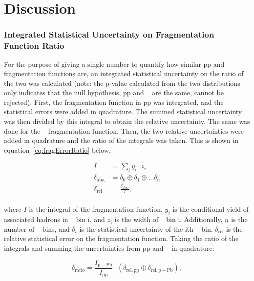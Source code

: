 \chapter{Discussion}

\subsection{Integrated Statistical Uncertainty on Fragmentation Function Ratio}
For the purpose of giving a single number to quantify how similar pp and \pPb~ fragmentation functions are, an integrated statistical uncertainty on the ratio of the two was calculated (note: the p-value calculated from the two distributions only indicates that the null hypothesis, pp and \pPb~ are the same, cannot be rejected). First, the fragmentation function in pp was integrated, and the statistical errors were added in quadrature. The summed statistical uncertainty was then divided by this integral to obtain the relative uncertainty. The same was done for the \pPb~ fragmentation function. Then, the two relative uncertainties were added in quadrature and the ratio of the integrals was taken. This is shown in equation~\ref{eq:fragErrorRatio} below,

\begin{equation}\label{eq:fragErrorRatio}
\begin{split}
    I &= \sum_i y_i\cdot z_i \\
    \delta_\mathrm{abs.} &= \delta_0 \oplus \delta_1 \oplus ...\delta_n\\
    \delta_\mathrm{rel} &= \frac{\delta_\mathrm{abs.}}{I},\\
\end{split}
\end{equation}{}

where $I$ is the integral of the fragmentation function, $y_i$ is the conditional yield of associated hadrons in \zt~ bin i, and $z_i$ is the width of \zt~ bin i. Additionally, $n$ is the number of \zt~ bins, and $\delta_i$ is the statistical uncertainty of the ith \zt~ bin. $\delta_\mathrm{rel}$ is the relative statistical error on the fragmentation function. Taking the ratio of the integrals and summing the uncertainties from pp and \pPb~ in quadrature:

\begin{equation}
    \delta_\mathrm{ratio} = \frac{I_\mathrm{p-Pb}}{I_\mathrm{pp}}\cdot (\delta_\mathrm{rel,pp} \oplus \delta_\mathrm{rel,p-Pb}),
\end{equation}


